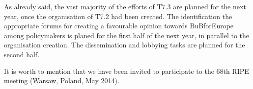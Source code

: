 As already said, the vast majority of the efforts of T7.3 are planned for the next year, once the organisation of T7.2 had been created. The identification the appropriate forums for creating a favourable opinion towards BuBforEurope among policymakers is planed for the first half of the next year, in parallel to the organisation creation. The dissemination and lobbying tasks are planned for the second half.

It is worth to mention that we have been invited to participate to the 68th RIPE meeting (Warsaw, Poland, May 2014).